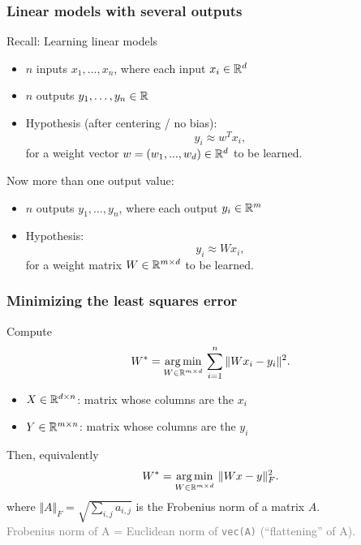 \documentclass[aspectratio=149]{beamer}
\begin{document}
\begin{frame}
  \frametitle{Linear models with several outputs}
  Recall: Learning linear models
  \begin{itemize}
    \item $n$ inputs $x_1,\dots,x_n$, where each input $x_i \in \mathbb{R}^d$
    \item $n$ outputs $y_1,\dots,y_n \in \mathbb{R}$
    \item Hypothesis (after centering / no bias):
          \begin{equation}
            y_i \approx w^T x_i ,
          \end{equation}
          for a weight vector $w = (w_1,...,w_d) \in \mathbb{R}^d$ to be learned.
  \end{itemize}

  Now more than one output value:
  \begin{itemize}
    \item $n$ outputs $y_1,\dots,y_n$, where each output $y_i \in \mathbb{R}^m$
    \item Hypothesis:
          \begin{equation}
            y_i \approx W x_i,
          \end{equation}
          for a weight matrix $W \in \mathbb{R}^{m\times d}$ to be learned.
  \end{itemize}
\end{frame}


\begin{frame}
  \frametitle{Minimizing the least squares error}

  Compute
  \begin{equation}
    W^* = \operatorname*{arg\,min}_{W\in \mathbb{R}^{m\times d}}\, \sum_{i=1}^{n} \Vert W x_i - y_i \Vert^2.
  \end{equation}

  \begin{itemize}
    \item $X \in \mathbb{R}^{d \times n}$: matrix whose columns are the $x_i$
    \item $Y \in \mathbb{R}^{m \times n}$: matrix whose columns are the $y_i$
  \end{itemize}
  Then, equivalently
  \begin{equation}
    W^* = \operatorname*{arg\,min}_{W\in \mathbb{R}^{m\times d}}\, \Vert W x - y \Vert_F^2.
  \end{equation}
  where $\Vert A \Vert_F = \sqrt{\sum_{i,j} a_{i,j}}$ is the Frobenius norm of a matrix $A$.\\
  \textcolor{gray}{Frobenius norm of A = Euclidean norm of \texttt{vec(A)} (``flattening'' of A).}

\end{frame}
\end{document}

